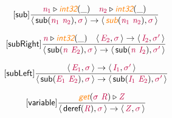 \documentclass[10pt,leqno,fleqn]{article}
\newcommand{\artVariable}[1]{\mbox{\color{purple}\em #1\/}}
\newcommand{\artConstructor}[1]{\mbox{\sf #1}}
\newcommand{\artSpecial}[1]{\mbox{\color{orange}\sf\em #1}}
\begin{document}
\begin{equation}
\tag*{[\artConstructor{\sf sub}]}
\begin{split}\frac{ \artVariable{n$_{1}$}\triangleright \artSpecial{int32}(\_) \quad  \artVariable{n$_{2}$}\triangleright \artSpecial{int32}(\_) }{\langle\, \artConstructor{\sf sub}(\artVariable{n$_{1}$}\ \artVariable{n$_{2}$}), \artVariable{$\sigma$}\,\rangle \rightarrow \langle\, \artSpecial{sub}(\artVariable{n$_{1}$}\ \artVariable{n$_{2}$}), \artVariable{$\sigma$}\,\rangle }
\end{split}
\end{equation}

\begin{equation}
\tag*{[\artConstructor{\sf subRight}]}
\begin{split}\frac{ \artVariable{n}\triangleright \artSpecial{int32}(\_) \quad \langle\, \artVariable{E$_{2}$}, \artVariable{$\sigma$}\,\rangle \rightarrow \langle\, \artVariable{I$_{2}$}, \artVariable{$\sigma$\/$^\prime$}\,\rangle }{\langle\, \artConstructor{\sf sub}(\artVariable{n}\ \artVariable{E$_{2}$}), \artVariable{$\sigma$}\,\rangle \rightarrow \langle\, \artConstructor{\sf sub}(\artVariable{n}\ \artVariable{I$_{2}$}), \artVariable{$\sigma$\/$^\prime$}\,\rangle }
\end{split}
\end{equation}

\begin{equation}
\tag*{[\artConstructor{\sf subLeft}]}
\begin{split}\frac{\langle\, \artVariable{E$_{1}$}, \artVariable{$\sigma$}\,\rangle \rightarrow \langle\, \artVariable{I$_{1}$}, \artVariable{$\sigma$\/$^\prime$}\,\rangle }{\langle\, \artConstructor{\sf sub}(\artVariable{E$_{1}$}\ \artVariable{E$_{2}$}), \artVariable{$\sigma$}\,\rangle \rightarrow \langle\, \artConstructor{\sf sub}(\artVariable{I$_{1}$}\ \artVariable{E$_{2}$}), \artVariable{$\sigma$\/$^\prime$}\,\rangle }
\end{split}
\end{equation}

\begin{equation}
\tag*{[\artConstructor{\sf variable}]}
\begin{split}\frac{ \artSpecial{get}(\artVariable{$\sigma$}\ \artVariable{R})\triangleright \artVariable{Z} }{\langle\, \artConstructor{\sf deref}(\artVariable{R}), \artVariable{$\sigma$}\,\rangle \rightarrow \langle\, \artVariable{Z}, \artVariable{$\sigma$}\,\rangle }
\end{split}
\end{equation}
\end{document}
